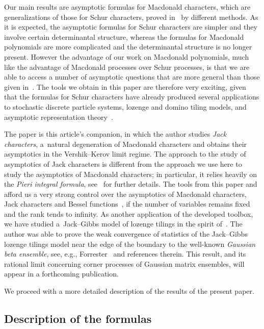 \documentclass[pdftex]{sigma}
\numberwithin{equation}{section}
\begin{document}
Our main results are asymptotic formulas for Macdonald characters, which are generalizations of those for Schur characters, proved in~\cite{GP} by dif\/ferent methods. As it is expected, the asymptotic formulas for Schur characters are simpler and they involve certain determinantal structure, whereas the formulas for Macdonald polynomials are more complicated and the determinantal structure is no longer present. However the advantage of our work on Macdonald polynomials, much like the advantage of Macdonald processes over Schur processes, is that we are able to access a number of asymptotic questions that are more general than those given in~\cite{GP}. The tools we obtain in this paper are therefore very exciting, given that the formulas for Schur characters have already produced several applications to stochastic discrete particle systems, lozenge and domino tiling models, and asymptotic representation theory~\cite{BuG1, BuG2,BuK,G0, GP,Pa}.

The paper \cite{Cu} is this article's companion, in which the author studies \textit{Jack characters}, a~natural degeneration of Macdonald characters and obtains their asymptotics in the Vershik--Kerov limit regime. The approach to the study of asymptotics of Jack characters is dif\/ferent from the approach we use here to study the asymptotics of Macdonald characters; in particular, it relies heavily on the \textit{Pieri integral formula}, see~\cite{Cu} for further details. The tools from this paper and~\cite{Cu} af\/ford us a very strong control over the asymptotics of Macdonald characters, Jack characters and Bessel functions~\cite{OO0, Op}, if the number of variables remains f\/ixed and the rank tends to inf\/inity. As another application of the developed toolbox, we have studied a~Jack--Gibbs model of lozenge tilings in the spirit of~\cite{BGG, GS}. The author was able to prove the weak convergence of statistics of the Jack--Gibbs lozenge tilings model near the edge of the boundary to the well-known \textit{Gaussian beta ensemble}, see, e.g., Forrester~\cite[Chapter~20]{Ox} and references therein. This result, and its rational limit concerning corner processes of Gaussian matrix ensembles, will appear in a forthcoming publication.

We proceed with a more detailed description of the results of the present paper.

\subsection{Description of the formulas}
\end{document}

